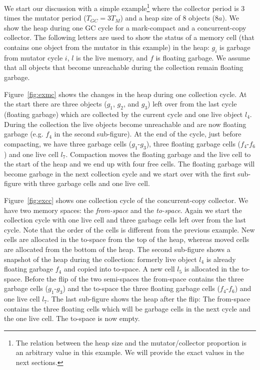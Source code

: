 We start our discussion with a simple example\footnote{The relation
between the heap size and the mutator/collector proportion is an
arbitrary value in this example. We will provide the exact values in
the next sections.} where the collector period is 3 times the mutator
period ($T_{GC} = 3 T_M$) and a heap size of 8 objects ($8a$). We
show the heap during one GC cycle for a mark-compact and a
concurrent-copy collector. The following letters are used to show the
status of a memory cell (that contains one object from the mutator in
this example) in the heap: $g_i$ is garbage from mutator cycle $i$,
$l$ is the live memory, and $f$ is floating garbage. We assume that
all objects that become unreachable during the collection remain
floating garbage.

Figure~\ref{fig:exmc} shows the changes in the heap during one
collection cycle. At the start there are three objects ($g_1$,
$g_2$, and $g_3$) left over from the last cycle (floating garbage)
which are collected by the current cycle and one live object $l_4$.
During the collection the live objects become unreachable and are
now floating garbage (e.g. $f_4$ in the second sub-figure). At the
end of the cycle, just before compacting, we have three garbage
cells ($g_1$-$g_3$), three floating garbage cells ($f_4$-$f_6$) and
one live cell $l_7$. Compaction moves the floating garbage and the
live cell to the start of the heap and we end up with four free
cells. The floating garbage will become garbage in the next
collection cycle and we start over with the first sub-figure with
three garbage cells and one live cell.

Figure~\ref{fig:excc} shows one collection cycle of the
concurrent-copy collector. We have two memory spaces: the
\emph{from-space} and the \emph{to-space}. Again we start the
collection cycle with one live cell and three garbage cells left over
from the last cycle. Note that the order of the cells is different
from the previous example. New cells are allocated in the to-space
from the top of the heap, whereas moved cells are allocated from the
bottom of the heap. The second sub-figure shows a snapshot of the
heap during the collection: formerly live object $l_4$ is already
floating garbage $f_4$ and copied into to-space. A new cell $l_5$ is
allocated in the to-space. Before the flip of the two semi-spaces the
from-space contains the three garbage cells ($g_1$-$g_3$) and the
to-space the three floating garbage cells ($f_4$-$f_6$) and one live
cell $l_7$. The last sub-figure shows the heap after the flip: The
from-space contains the three floating cells which will be garbage
cells in the next cycle and the one live cell. The to-space is now
empty.


